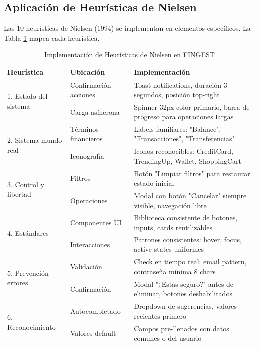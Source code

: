 \documentclass[12pt,a4paper,oneside]{article}
\begin{document}
\newpage

\subsection{Aplicación de Heurísticas de Nielsen}

Las 10 heurísticas de Nielsen (1994) se implementan en elementos específicos. La Tabla \ref{tab:nielsen-implementacion} mapea cada heurística.


\begin{table}[h]
\centering
\caption{Implementación de Heurísticas de Nielsen en FINGEST}
\label{tab:nielsen-implementacion}
\scriptsize
\setlength{\tabcolsep}{4pt}
\begin{tabular}{|p{3cm}|p{2cm}|p{5.2cm}|}
\hline
\textbf{Heurística} & \textbf{Ubicación} & \textbf{Implementación} \\
\hline
\multirow{2}{*}{1. Estado del sistema} 
& Confirmación acciones & Toast notifications, duración 3 segundos, posición top-right \\
\cline{2-3}
& Carga asíncrona & Spinner 32px color primario, barra de progreso para operaciones largas \\
\hline
\multirow{2}{*}{2. Sistema-mundo real} 
& Términos financieros & Labels familiares: "Balance", "Transacciones", "Transferencias" \\
\cline{2-3}
& Iconografía & Iconos reconocibles: CreditCard, TrendingUp, Wallet, ShoppingCart \\
\hline
\multirow{2}{*}{3. Control y libertad} 
& Filtros & Botón "Limpiar filtros" para restaurar estado inicial \\
\cline{2-3}
& Operaciones & Modal con botón "Cancelar" siempre visible, navegación libre \\
\hline
\multirow{2}{*}{4. Estándares} 
& Componentes UI & Biblioteca consistente de botones, inputs, cards reutilizables \\
\cline{2-3}
& Interacciones & Patrones consistentes: hover, focus, active states uniformes \\
\hline
\multirow{2}{*}{5. Prevención errores} 
& Validación & Check en tiempo real: email pattern, contraseña mínima 8 chars \\
\cline{2-3}
& Confirmación & Modal "¿Estás seguro?" antes de eliminar, botones deshabilitados \\
\hline
\multirow{2}{*}{6. Reconocimiento} 
& Autocompletado & Dropdown de sugerencias, valores recientes primero \\
\cline{2-3}
& Valores default & Campos pre-llenados con datos comunes o del usuario \\

\end{tabular}
\end{table}
\end{document}
